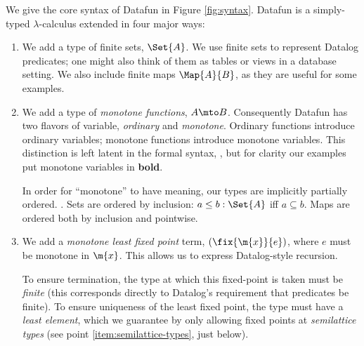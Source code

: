 \documentclass[preprint]{sigplanconf}
\begin{document}
We give the core syntax of Datafun in Figure \ref{fig:syntax}. Datafun is a
simply-typed $\lambda$-calculus extended in four major ways:

\begin{enumerate}
\item We add a type of finite sets, $\Set{A}$. We use finite sets to represent
  Datalog predicates; one might also think of them as tables or views in a
  database setting. We also include finite maps $\Map{A}{B}$, as they are useful
  for some examples.


\item We add a type of \emph{monotone functions}, $A \mto B$. Consequently
  Datafun has two flavors of variable, \emph{ordinary} and \emph{monotone}.
  Ordinary functions introduce ordinary variables; monotone functions introduce
  monotone variables. This distinction is left latent in the formal syntax,
  , but for clarity our examples put monotone variables in
  \textbf{bold}.

  In order for ``monotone'' to have meaning, our types are implicitly partially
  ordered. . Sets are ordered by inclusion: $a \le b :
  \Set{A}$ iff $a \subseteq b$. Maps are ordered both by inclusion and
  pointwise.

\item We add a \emph{monotone least fixed point} term, $(\fix{\m{x}}{e})$,
  where $e$ must be monotone in $\m{x}$. This allows us to express
  Datalog-style recursion.


  To ensure termination, the type at which this fixed-point is taken must be
  \emph{finite} (this corresponds directly to Datalog's requirement that
  predicates be finite). To ensure uniqueness of the least fixed point, the type
  must have a \emph{least element}, which we guarantee by only allowing fixed
  points at \emph{semilattice types} (see point \ref{item:semilattice-types},
  just below).


\end{enumerate}
\end{document}

